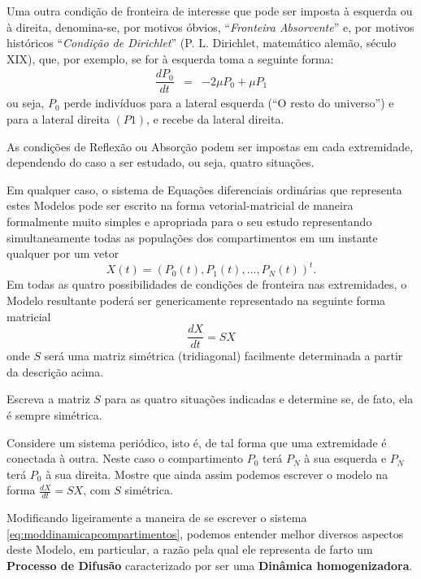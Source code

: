     Uma outra condição de fronteira de interesse que pode ser imposta à esquerda ou à direita, denomina-se, por motivos óbvios, ``\textit{Fronteira Absorvente}'' e, por motivos históricos ``\textit{Condição de Dirichlet}'' (P. L. Dirichlet, matemático alemão, século XIX), que, por exemplo, se for à esquerda toma a seguinte forma: 
    \begin{eqnarray}\label{eq:moddinamicapcompartimentosesquerda}
    \dfrac{dP_0}{dt} &=& -2\mu P_{0} + \mu P_{1}
    \end{eqnarray}
    ou seja, \(P_0\) perde indivíduos para a lateral esquerda (``O resto do universo'') e para a lateral direita \((P1)\), e recebe da lateral direita.

    As condições de Reflexão ou Absorção podem ser impostas em cada extremidade, dependendo do caso a ser estudado, ou seja, quatro situações. 

    Em qualquer caso, o sistema de Equações diferenciais ordinárias que representa estes Modelos pode ser escrito na forma vetorial-matricial de maneira formalmente muito simples e apropriada para o seu estudo representando simultaneamente todas as populações dos compartimentos em um instante qualquer por um vetor
    \[X(t) = (P_0(t), P_1(t), \ldots, P_N(t))^t.\]
    Em todas as quatro possibilidades de condições de fronteira nas extremidades, o Modelo resultante poderá ser genericamente representado na seguinte forma matricial
    \[\dfrac{dX}{dt} = SX\] 
    onde \(S\) será uma matriz simétrica (tridiagonal) facilmente determinada a partir da descrição acima. 

    \begin{exercise}
    Escreva a matriz \(S\) para as quatro situações indicadas e determine se, de fato, ela é sempre simétrica. 
    \end{exercise}

    \begin{exercise}
    Considere um sistema periódico, isto é, de tal forma que uma extremidade é conectada à outra. Neste caso o compartimento \(P_0\) terá \(P_N\) à sua esquerda e \(P_N\) terá \(P_0\) à sua direita. Mostre que ainda assim podemos escrever o modelo na forma \(\frac{dX}{dt} = SX\), com \(S\) simétrica.
    \end{exercise}

    Modificando ligeiramente a maneira de se escrever o sistema \eqref{eq:moddinamicapcompartimentos}, podemos entender melhor diversos aspectos deste Modelo, em particular, a razão pela qual ele representa de farto um \textbf{Processo de Difusão} caracterizado por ser uma \textbf{Dinâmica homogenizadora}.

